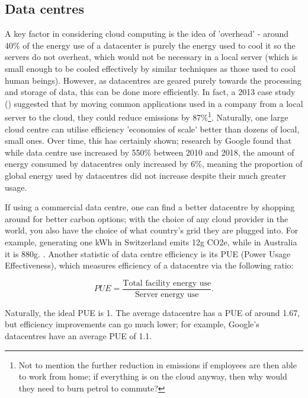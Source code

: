 \documentclass{article}
\begin{document}
\subsection{Data centres}
A key factor in considering cloud computing is the idea of 'overhead' - around 40\% of the energy use of a datacenter is purely the energy used to cool it so the servers do not overheat,  \citep{lannelongue2021ten} which would not be necessary in a local server (which is small enough to be cooled effectively by similar techniques as those used to cool human beings). However, as datacentres are geared purely towards the processing and storage of data, this can be done more efficiently. In fact, a 2013 case study (\citet{masanet2013energy}) suggested that by moving common applications used in a company from a local server to the cloud, they could reduce emissions by 87\%\footnote{Not to mention the further reduction in emissions if employees are then able to work from home; if everything is on the cloud anyway, then why would they need to burn petrol to commute?}. Naturally, one large cloud centre can utilise efficiency 'economies of scale' better than dozens of local, small ones. Over time, this has certainly shown; research by Google found that while data centre use increased by 550\% between 2010 and 2018, the amount of energy consumed by datacentres only increased by 6\%, meaning the proportion of global energy used by datacentres did not increase despite their much greater usage. \citep{masanet2020recalibrating}\newline

If using a commercial data centre, one can find a better datacentre by shopping around for better carbon options; with the choice of any cloud provider in the world, you also have the choice of what country's grid they are plugged into. For example, generating one kWh in Switzerland emits 12g CO2e, while in Australia it is 880g. \citep{grealey2021carbon}. Another statistic of data centre efficiency is its PUE (Power Usage Effectiveness), which measures efficiency of a datacentre via the following ratio:

$$PUE = \frac{\textrm{Total facility energy use}}{\textrm{Server energy use}}.$$

Naturally, the ideal PUE is 1. The average datacentre has a PUE of around 1.67, but efficiency improvements can go much lower; for example, Google's datacentres have an average PUE of 1.1. \citep{holzle2020data}\newline
\end{document}
